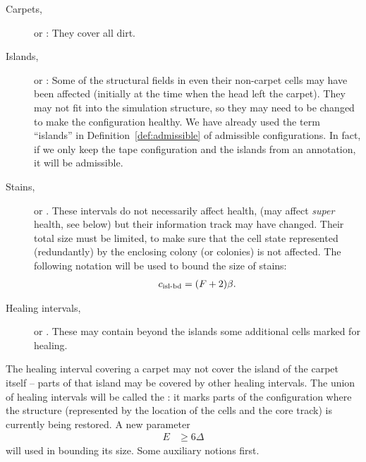 \documentclass[12pt]{memoir}
\renewcommand{\ge}{\geq}
\newcommand{\E}{E}
\newcommand{\F}{F}
\newcommand{\cns}[1]{c_{\textrm{\upshape #1}}}
\begin{document}
\begin{description}

\item[Carpets,] or : They cover all dirt.

\item[Islands,] or : 
Some of the structural fields in even their non-carpet cells
may have been affected (initially at the time when the head left the carpet).
They may not fit into the simulation structure, so they
may need to be changed to make the configuration healthy.
We have already used the term ``islands'' in Definition~\ref{def:admissible} of
admissible configurations.
In fact, if we only keep the tape configuration and the islands from an annotation,
it will be admissible.

\item[Stains,] or .
These intervals do not necessarily affect health, (may affect \emph{super} health, see below)
but their information track may have changed.
Their total size must be limited, to make sure that the cell state represented (redundantly) by the
enclosing colony (or colonies) is not affected.
The following notation will be used to bound the size of stains:
\begin{align}\label{eq:isl-bd}
   \cns{isl-bd} = (\F+2)\beta.
 \end{align}

\item[Healing intervals,] or .
These may contain beyond the islands some additional cells marked for healing.
\end{description}

The healing interval covering a carpet may not cover the island of the carpet
itself -- parts of that island may be covered by other healing intervals.
The union of healing intervals will be called the : 
it marks parts of the configuration where the
structure (represented by the location of the cells and the core track) 
is currently being restored.
A new parameter 
\begin{align}\label{eq:expansion}
                          \E  &\ge 6\Delta %
 \end{align}
will used in bounding its size.
Some auxiliary notions first.
\end{document}
